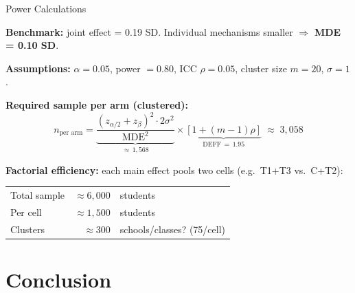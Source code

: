 \documentclass[aspectratio=169,11pt]{beamer}
\begin{document}
\begin{frame}{Power Calculations}

\textbf{Benchmark:} \citet{bergman2021information} joint effect = 0.19 SD. Individual mechanisms smaller $\Rightarrow$ \textbf{MDE = 0.10 SD}.

\medskip

\textbf{Assumptions:} $\alpha = 0.05$, power $= 0.80$, ICC $\rho = 0.05$, cluster size $m = 20$, $\sigma = 1$.

\bigskip

\textbf{Required sample per arm (clustered):}
\[
n_{\text{per arm}} = \underbrace{\frac{(z_{\alpha/2} + z_\beta)^2 \cdot 2\sigma^2}{\text{MDE}^2}}_{\approx\, 1{,}568} \times \underbrace{[1 + (m-1)\rho]}_{\text{DEFF}\,=\,1.95} \;\approx\; 3{,}058
\]

\bigskip

\textbf{Factorial efficiency:} each main effect pools two cells (e.g.\ T1+T3 vs.\ C+T2):

\medskip

\begin{center}
\begin{tabular}{@{}lrl@{}}
\toprule
Total sample & $\approx 6{,}000$ & students \\
Per cell & $\approx 1{,}500$ & students \\
Clusters & $\approx 300$ & schools/classes? (75/cell) \\
\bottomrule
\end{tabular}
\end{center}

\medskip



\end{frame}
\section{Conclusion}
\end{document}
